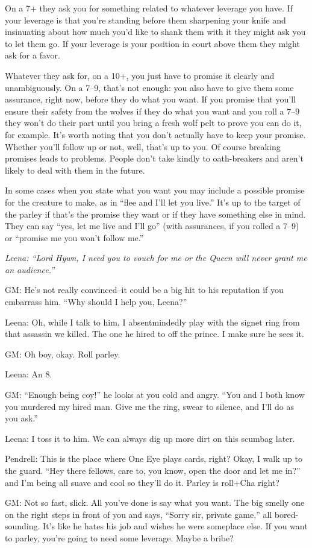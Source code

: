  On a 7+ they ask you for something related to whatever leverage you have. If your leverage is that you're standing before them sharpening your knife and insinuating about how much you'd like to shank them with it they might ask you to let them go. If your leverage is your position in court above them they might ask for a favor.


 Whatever they ask for, on a 10+, you just have to promise it clearly and unambiguously. On a 7--9, that's not enough: you also have to give them some assurance, right now, before they do what you want. If you promise that you'll ensure their safety from the wolves if they do what you want and you roll a 7--9 they won't do their part until you bring a fresh wolf pelt to prove you can do it, for example. It's worth noting that you don't actually have to keep your promise. Whether you'll follow up or not, well, that's up to you. Of course breaking promises leads to problems. People don't take kindly to oath-breakers and aren't likely to deal with them in the future.


 In some cases when you state what you want you may include a possible promise for the creature to make, as in ``flee and I'll let you live.'' It's up to the target of the parley if that's the promise they want or if they have something else in mind. They can say ``yes, let me live and I'll go'' (with assurances, if you rolled a 7--9) or ``promise me you won't follow me.''


{\itshape
 Leena: ``Lord Hywn, I need you to vouch for me or the Queen will never grant me an audience.''


 GM: He's not really convinced--it could be a big hit to his reputation if you embarrass him. ``Why should I help you, Leena?''


 Leena: Oh, while I talk to him, I absentmindedly play with the signet ring from that assassin we killed. The one he hired to off the prince. I make sure he sees it.


 GM: Oh boy, okay. Roll parley.


 Leena: An 8.


 GM: ``Enough being coy!'' he looks at you cold and angry. ``You and I both know you murdered my hired man. Give me the ring, swear to silence, and I'll do as you ask.''


 Leena: I toss it to him. We can always dig up more dirt on this scumbag later.


 Pendrell: This is the place where One Eye plays cards, right? Okay, I walk up to the guard. ``Hey there fellows, care to, you know, open the door and let me in?'' and I'm being all suave and cool so they'll do it. Parley is roll+Cha right?


 GM: Not so fast, slick. All you've done is say what you want. The big smelly one on the right steps in front of you and says, ``Sorry sir, private game,'' all bored-sounding. It's like he hates his job and wishes he were someplace else. If you want to parley, you're going to need some leverage. Maybe a bribe?
}
